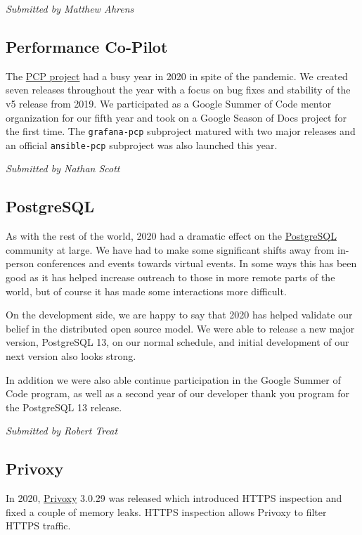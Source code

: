 \documentclass[a4paper]{report}
\begin{document}
{\em Submitted by Matthew Ahrens}

\subsection{Performance Co-Pilot}

The \href{https://pcp.io/}{PCP project} had a busy year in 2020 in spite of the pandemic.  We created seven releases throughout the year with a focus on bug fixes and stability of the v5 release from 2019.  We participated as a Google Summer of Code mentor organization for our fifth year and took on a Google Season of Docs project for the first time.  The \texttt{grafana-pcp} subproject matured with two major releases and an official \texttt{ansible-pcp} subproject was also launched this year.

{\em Submitted by Nathan Scott}

\subsection{PostgreSQL}

As with the rest of the world, 2020 had a dramatic effect on the \href{https://www.postgresql.org/}{PostgreSQL} community at large. We have had to make some significant shifts away from in-person conferences and events towards virtual events. In some ways this has been good as it has helped increase outreach to those in more remote parts of the world, but of course it has made some interactions more difficult.

On the development side, we are happy to say that 2020 has helped validate our belief in the distributed open source model. We were able to release a new major version, PostgreSQL 13, on our normal schedule, and initial development of our next version also looks strong.

In addition we were also able continue participation in the Google Summer of Code program, as well as a second year of our developer thank you program for the PostgreSQL 13 release.

{\em Submitted by Robert Treat}

\subsection{Privoxy}

In 2020, \href{https://www.privoxy.org/}{Privoxy} 3.0.29 was released which introduced HTTPS inspection and fixed a couple of memory leaks.  HTTPS inspection allows Privoxy to filter HTTPS traffic.
\end{document}
